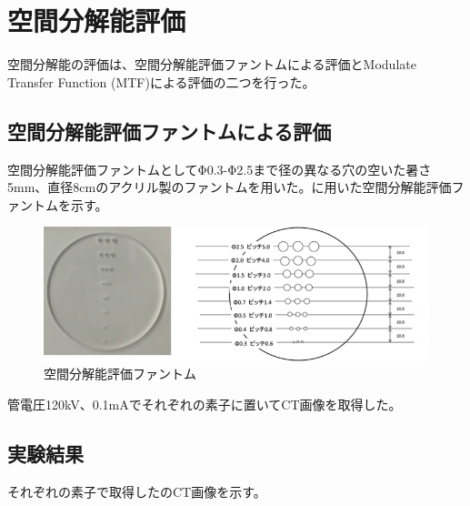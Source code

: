 \section{空間分解能評価}

空間分解能の評価は、空間分解能評価ファントムによる評価とModulate Transfer Function (MTF)による評価の二つを行った。
\subsection{空間分解能評価ファントムによる評価}
空間分解能評価ファントムとしてΦ0.3-Φ2.5まで径の異なる穴の空いた暑さ5mm、直径8cmのアクリル製のファントムを用いた。に用いた空間分解能評価ファントムを示す。
\begin{figure}[H]
 \begin{center}
 \includegraphics[bb=0.000000 0.000000 350.850996 121.909922,width=1.0\hsize]{image2/chapter5/spatial_phantom.png}
 \end{center}
 \caption{空間分解能評価ファントム}
 \label{fig:spatial_phantom}
\end{figure}
管電圧120kV、0.1mAでそれぞれの素子に置いてCT画像を取得した。

\subsection{実験結果}

それぞれの素子で取得したのCT画像を示す。

